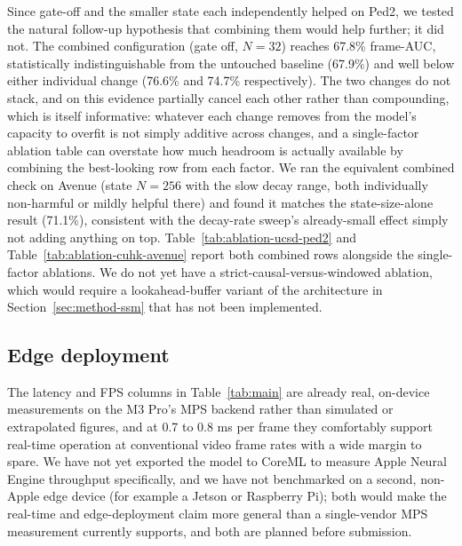Since gate-off and the smaller state each independently helped on Ped2, we tested the natural follow-up hypothesis that combining them would help further; it did not. The combined configuration (gate off, $N{=}32$) reaches 67.8\% frame-AUC, statistically indistinguishable from the untouched baseline (67.9\%) and well below either individual change (76.6\% and 74.7\% respectively). The two changes do not stack, and on this evidence partially cancel each other rather than compounding, which is itself informative: whatever each change removes from the model's capacity to overfit is not simply additive across changes, and a single-factor ablation table can overstate how much headroom is actually available by combining the best-looking row from each factor. We ran the equivalent combined check on Avenue (state $N{=}256$ with the slow decay range, both individually non-harmful or mildly helpful there) and found it matches the state-size-alone result (71.1\%), consistent with the decay-rate sweep's already-small effect simply not adding anything on top. Table~\ref{tab:ablation-ucsd-ped2} and Table~\ref{tab:ablation-cuhk-avenue} report both combined rows alongside the single-factor ablations. We do not yet have a strict-causal-versus-windowed ablation, which would require a lookahead-buffer variant of the architecture in Section~\ref{sec:method-ssm} that has not been implemented.

\subsection{Edge deployment}
The latency and FPS columns in Table~\ref{tab:main} are already real, on-device measurements on the M3 Pro's MPS backend rather than simulated or extrapolated figures, and at 0.7 to 0.8 ms per frame they comfortably support real-time operation at conventional video frame rates with a wide margin to spare. We have not yet exported the model to CoreML to measure Apple Neural Engine throughput specifically, and we have not benchmarked on a second, non-Apple edge device (for example a Jetson or Raspberry Pi); both would make the real-time and edge-deployment claim more general than a single-vendor MPS measurement currently supports, and both are planned before submission.
